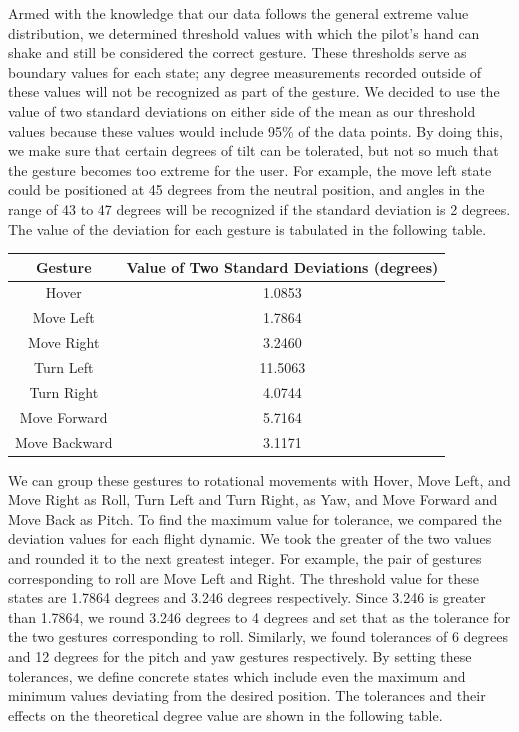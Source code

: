 \documentclass[letterpaper,english, 12pt]{article}
\begin{document}
Armed with the knowledge that our data follows the general extreme value distribution, we determined threshold values with which the pilot's hand can shake and still be considered the correct gesture. These thresholds serve as boundary values for each state; any degree measurements recorded outside of these values will not be recognized as part of the gesture. We decided to use the value of two standard deviations on either side of the mean as our threshold values because these values would include 95\% of the data points. By doing this, we make sure that certain degrees of tilt can be tolerated, but not so much that the gesture becomes too extreme for the user. For example, the move left state could be positioned at 45 degrees from the neutral position, and angles in the range of 43 to 47 degrees will be recognized if the standard deviation is 2 degrees. The value of the deviation for each gesture is tabulated in the following table.

\begin{center}
	\begin{tabular}{|c|c|} 
		\hline
			Gesture & Value of Two Standard Deviations (degrees) \\
		\hline
			Hover & 1.0853 \\
		\hline
			Move Left & 1.7864 \\
		\hline
			Move Right & 3.2460 \\
		\hline
			Turn Left & 11.5063 \\
		\hline
			Turn Right & 4.0744 \\
		\hline
			Move Forward & 5.7164 \\
		\hline
			Move Backward & 3.1171 \\
		\hline
	\end{tabular}
\end{center}

We can group these gestures to rotational movements with Hover, Move Left, and Move Right as Roll, Turn Left and Turn Right, as Yaw, and Move Forward and Move Back as Pitch. To find the maximum value for tolerance, we compared the deviation values for each flight dynamic. We took the greater of the two values and rounded it to the next greatest integer. For example, the pair of gestures corresponding to roll are Move Left and Right. The threshold value for these states are 1.7864 degrees and 3.246 degrees respectively. Since 3.246 is greater than 1.7864, we round 3.246 degrees to 4 degrees and set that as the tolerance for the two gestures corresponding to roll. Similarly, we found tolerances of 6 degrees and 12 degrees for the pitch and yaw gestures respectively. By setting these tolerances, we define concrete states which include even the maximum and minimum values deviating from the desired position. The tolerances and their effects on the theoretical degree value are shown in the following table.
\end{document}
